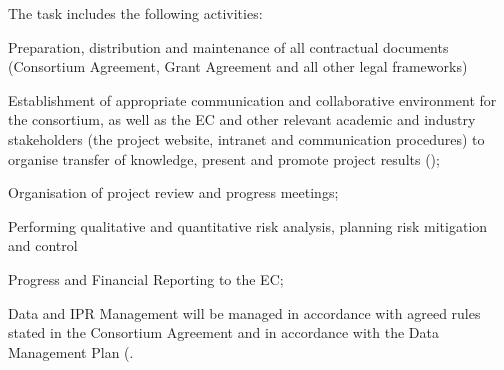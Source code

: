 \begin{workpackage}[id=management,type=MGT,wphases=0-36!.25,
  title=Project Management,
  short=Management,
  lead=SRL,
  MPRM=1,
  QSRM=1,
  IFRRM=1,
  UIORM=1,
  SRLRM=12,
  swsites
]
\begin{tasklist}
\begin{task}[
  title=Administrative Management,
  id=admin,
  lead=SRL,
  PM=6,
  wphases={0-36!.166},
  partners={MP,QS,UIO,IFR},
]
The task includes the following activities:
\begin{compactenum}
\item Preparation, distribution and maintenance of all contractual documents
  (Consortium Agreement, Grant Agreement and all other legal frameworks)
\item Establishment of appropriate communication and collaborative environment
  for the consortium, as well as the EC and other relevant academic and industry
  stakeholders (the project website, intranet and communication procedures) to
  organise transfer of knowledge, present and promote project results
  ();
\item Organisation of project review and progress meetings;
\item Performing qualitative and quantitative risk analysis, planning risk
  mitigation and control
\item Progress and Financial Reporting to the EC;
\item Data and IPR Management will be managed in accordance with agreed rules
  stated in the Consortium Agreement and in accordance with the Data Management
  Plan (.
\end{compactenum}
\end{task}


\end{tasklist}
\end{workpackage}
